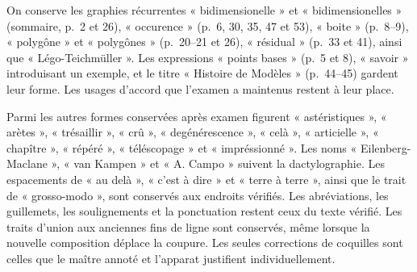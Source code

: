 \par\smallskip
On conserve les graphies récurrentes « bidimensionelle » et
« bidimensionelles » (sommaire, p.~2 et 26), « occurence » (p.~6, 30, 35,
47 et 53), « boite » (p.~8--9), « polygône » et « polygônes » (p.~20--21
et 26), « résidual » (p.~33 et 41), ainsi que « Légo-Teichmüller ».
Les expressions « points bases »
(p.~5 et 8), « savoir » introduisant un exemple, et le titre « Histoire
de Modèles » (p.~44--45) gardent leur forme. Les usages d'accord que
l'examen a maintenus restent à leur place.
\par
Parmi les autres formes conservées après examen figurent « astéristiques »,
« arètes », « trésaillir », « crû », « degénérescence », « celà »,
« articielle », « chapître », « répéré », « téléscopage »
et « impréssionné ». Les noms « Eilenberg-Maclane », « van Kampen » et « A. Campo » suivent
la dactylographie. Les espacements de « au delà », « c'est à dire »
et « terre à terre », ainsi que le trait de « grosso-modo », sont
conservés aux endroits vérifiés. Les abréviations, les guillemets,
les soulignements et la ponctuation restent ceux du texte vérifié.
Les traits d'union aux anciennes fins de ligne sont conservés, même
lorsque la nouvelle composition déplace la coupure. Les seules
corrections de coquilles sont celles que le maître annoté et l'apparat
justifient individuellement.
